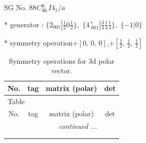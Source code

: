 \documentclass[fleqn,8pt]{jsarticle}
\begin{document}
\setcounter{MaxMatrixCols}{32}

\renewcommand{\tablename}{Table~}
\renewcommand{\figurename}{Figure~}
\begin{center}
\LARGE
SG No. 88\quad$C_{\rm 4h}^{6}$\quad$I4_1/a$\quad[ tetragonal ]
\end{center}

* generator : $\{2{}_{001}|\frac{1}{2} 0 \frac{1}{2}\},\,\,\{4^{+}_{\,\,001}|\frac{3}{4} \frac{1}{4} \frac{1}{4}\},\,\,\{-1|0\}$

* symmetry operation\quad$+\left[ 0,\, 0,\, 0 \right]$,\quad $+\left[ \frac{1}{2},\, \frac{1}{2},\, \frac{1}{2} \right]$
\renewcommand{\arraystretch}{1.3}
\begin{longtable}{cccc}
\caption{Symmetry operations for 3d polar vector.}
 \\
 \hline \hline
No. & tag & matrix (polar) & det \\ \hline \endfirsthead

\multicolumn{3}{l}{\tablename\ \thetable{}} \\
 \hline \hline
No. & tag & matrix (polar) & det \\ \hline \endhead

 \hline \hline
\multicolumn{3}{r}{\footnotesize\it continued ...} \\ \endfoot

 \hline \hline
\multicolumn{3}{r}{} \\ \endlastfoot


\end{longtable}
\end{document}
